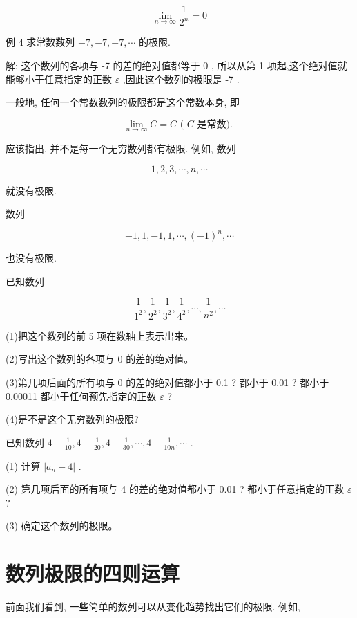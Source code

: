 \documentclass[lang=cn,newtx,10pt,scheme=chinese]{elegantbook}
\begin{document}
\[
\mathop{\lim }\limits_{{n \rightarrow \infty }}\frac{1}{{2}^{n}} = 0
\]

例 4 求常数数列 \(- 7, - 7, - 7,\cdots\) 的极限.

解: 这个数列的各项与 -7 的差的绝对值都等于 0 , 所以从第 1 项起,这个绝对值就能够小于任意指定的正数 \(\varepsilon\) ,因此这个数列的极限是 -7 .

一般地, 任何一个常数数列的极限都是这个常数本身, 即

\[
\mathop{\lim }\limits_{{n \rightarrow \infty }}C = C\text{ ( }C\text{ 是常数). }
\]

应该指出, 并不是每一个无穷数列都有极限. 例如, 数列

\[
1,2,3,\cdots ,n,\cdots
\]

就没有极限.

数列

\[
- 1,1, - 1,1,\cdots ,{\left( -1\right) }^{n},\cdots
\]

也没有极限.

\begin{problemset}[练习]
	\item 已知数列
	
	\[
	\frac{1}{{1}^{2}},\frac{1}{{2}^{2}},\frac{1}{{3}^{2}},\frac{1}{{4}^{2}},\cdots ,\frac{1}{{n}^{2}},\cdots
	\]
	
	(1)把这个数列的前 5 项在数轴上表示出来。
	
	(2)写出这个数列的各项与 0 的差的绝对值。
	
	(3)第几项后面的所有项与 0 的差的绝对值都小于 0.1 ? 都小于 0.01 ? 都小于 0.00011 都小于任何预先指定的正数 \(\varepsilon\) ?
	
	(4)是不是这个无穷数列的极限?
	
	\item 已知数列 \(4 - \frac{1}{10},4 - \frac{1}{20},4 - \frac{1}{30},\cdots ,4 - \frac{1}{10n},\cdots\) .
	
	(1) 计算 \(\left| {{a}_{n} - 4}\right|\) .
	
	(2) 第几项后面的所有项与 4 的差的绝对值都小于 0.01 ? 都小于任意指定的正数 \(\varepsilon\) ?
	
	(3) 确定这个数列的极限。
\end{problemset}



\section{数列极限的四则运算}
前面我们看到, 一些简单的数列可以从变化趋势找出它们的极限. 例如,
\end{document}

